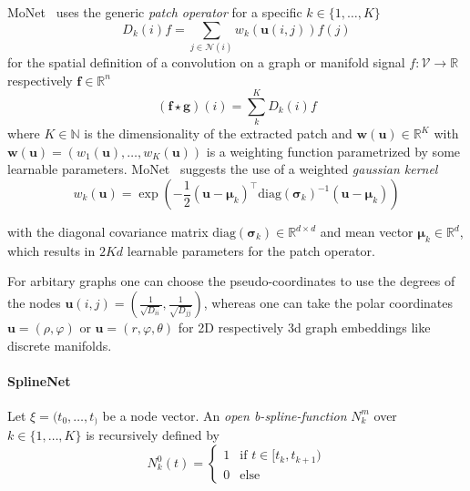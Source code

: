 \documentclass[pdftex,10pt,a4paper]{scrartcl}
\begin{document}
MoNet~\cite{Monti2016} uses the generic \emph{patch operator} for a specific $k \in \{ 1, \ldots, K \}$
\begin{equation*}
  D_k(i)f = \sum_{j \in \mathcal{N}(i)} w_k(\mathbf{u}(i, j)) f(j)
\end{equation*}
for the spatial definition of a convolution on a graph or manifold signal $f \colon \mathcal{V} \to \mathbb{R}$ respectively $\mathbf{f} \in \mathbb{R}^n$
\begin{equation*}
  (\mathbf{f} \star \mathbf{g})(i) = \sum_k^K D_k(i)f
\end{equation*}
where $K \in \mathbb{N}$ is the dimensionality of the extracted patch and $\mathbf{w}(\mathbf{u}) \in \mathbb{R}^K$ with $\mathbf{w}(\mathbf{u}) = (w_1(\mathbf{u}), \ldots, w_K(\mathbf{u}))$ is a weighting function parametrized by some learnable parameters.
MoNet~\cite{Monti2016} suggests the use of a weighted \emph{gaussian kernel}
\begin{equation*}
  w_k(\mathbf{u}) = \exp \left(-\frac{1}{2} {(\mathbf{u} - \boldsymbol{\mu}_k)}^{\top} {\mathrm{diag}(\boldsymbol{\sigma}_k)}^{-1} (\mathbf{u} - \boldsymbol{\mu}_k) \right)
\end{equation*}

with the diagonal covariance matrix $\mathrm{diag}(\boldsymbol{\sigma}_k) \in \mathbb{R}^{d \times d}$ and mean vector $\boldsymbol{\mu}_k \in \mathbb{R}^d$, which results in $2Kd$ learnable parameters for the patch operator.

For arbitary graphs one can choose the pseudo-coordinates to use the degrees of the nodes $\mathbf{u}(i,j) = \left( \tfrac{1}{\sqrt{D_{ii}}}, \tfrac{1}{\sqrt{D_{jj}}} \right)$, whereas one can take the polar coordinates $\mathbf{u} = (\rho, \varphi)$ or $\mathbf{u} = (r, \varphi, \theta)$ for 2D respectively 3d graph embeddings like discrete manifolds.

\paragraph{SplineNet}

Let $\xi = (t_0, \ldots, t_)$ be a node vector.
An \emph{open b-spline-function} $N_k^m$ over $k \in \{ 1, \ldots, K \}$ is recursively defined by
\begin{equation*}
  N_k^0(t) = \begin{cases}
    1 & \text{if } t \in [t_k, t_{k+1})\\
    0 & \text{else}
  \end{cases}
\end{equation*}
\end{document}
